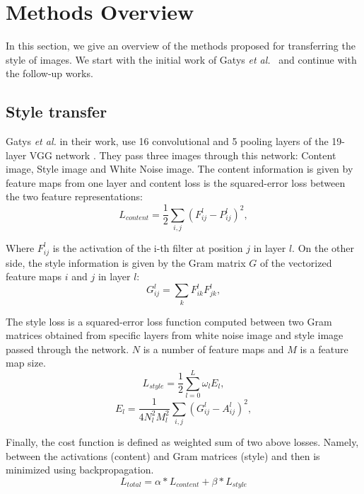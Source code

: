 \documentclass{llncs}
\begin{document}
\section{Methods Overview}

In this section, we give an overview of the methods proposed for transferring the style of images. We start with the initial work of Gatys {\it et al.}~\cite{gatys:} and continue with the follow-up works.

%
\subsection{Style transfer}
Gatys \textit{et al.} \cite{gatys:} in their work, use 16 convolutional and 5 pooling layers of the 19-layer VGG network \cite{vgg:}. They pass three images through this network: Content image, Style image and White Noise image. The content information is given by feature maps from one layer %
and content loss is the squared-error loss between the two feature representations:
\begin{equation}
  L_{content} = \frac{1}{2} \sum_{i,j} (F_{ij}^{l} - P_{ij}^{l})^2 ,
\end{equation}

Where $F_{ij}^{l}$ is the activation of the i-th filter at position $j$ in layer $l$. On the other side, the style information is given by the Gram matrix $G$ of the vectorized feature maps $i$ and $j$ in layer $l$:%
\begin{equation}
  G_{ij}^{l} = \sum_{k} F_{ik}^{l} F_{jk}^{l} ,
\end{equation}

The style loss is a squared-error loss function computed between two Gram matrices obtained from specific layers from white noise image and style image passed through the network. $N$ is a number of feature maps and $M$ is a feature map size.
\begin{equation}
  L_{style} = \frac{1}{2} \sum_{l=0}^L \omega_lE_l ,
\end{equation}
\begin{equation}
  E_{l} = \frac{1}{4N_l^2M_l^2} \sum_{i,j} (G_{ij}^{l} - A_{ij}^{l})^2 ,
\end{equation}

Finally, the cost function is defined as weighted sum of two above losses. Namely, between the activations (content) and Gram matrices (style) and then is minimized using backpropagation.
\begin{equation}
  L_{total} = \alpha*L_{content} + \beta*L_{style}
\end{equation}
\end{document}
